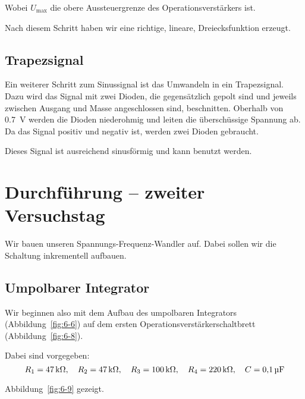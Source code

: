 Wobei $U_\text{max}$ die obere Aussteuergrenze des Operationsverstärkers ist.

Nach diesem Schritt haben wir eine richtige, lineare, Dreiecksfunktion erzeugt.

\subsection{Trapezsignal}

Ein weiterer Schritt zum Sinussignal ist das Umwandeln in ein Trapezsignal.
Dazu wird das Signal mit zwei Dioden, die gegensätzlich gepolt sind und jeweils
zwischen Ausgang und Masse angeschlossen sind, beschnitten. Oberhalb von
\SI{.7}{\volt} werden die Dioden niederohmig und leiten die überschüssige
Spannung ab. Da das Signal positiv und negativ ist, werden zwei Dioden
gebraucht.

Dieses Signal ist ausreichend sinusförmig und kann benutzt werden.


\FloatBarrier
\section{Durchführung – zweiter Versuchstag}

Wir bauen unseren Spannungs-Frequenz-Wandler auf. Dabei sollen wir die
Schaltung inkrementell aufbauen.

\subsection{Umpolbarer Integrator}

Wir beginnen also mit dem Aufbau des umpolbaren Integrators
(Abbildung~\ref{fig:6-6}) auf dem ersten Operationsverstärkerschaltbrett
(Abbildung~\ref{fig:6-8}).

Dabei sind vorgegeben:
\[
	R_1 = \SI{47}{\kilo\ohm} ,\quad
	R_2 = \SI{47}{\kilo\ohm} ,\quad
	R_3 = \SI{100}{\kilo\ohm} ,\quad
	R_4 = \SI{220}{\kilo\ohm} ,\quad
	C = \SI{.1}{\micro\farad}
\] 

Abbildung~\ref{fig:6-9}
gezeigt.


\FloatBarrier
\IfFileExists{\bibliographyfile}{
	
}{}



